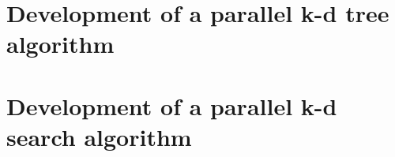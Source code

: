 







\section{Development of a parallel k-d tree algorithm} %
\label{sec:development_of_a_parallel_k_d_tree_algorithm}



\section{Development of a parallel k-d search algorithm} %
\label{sec:development_of_a_parallel_k_d_search_algorithm}

